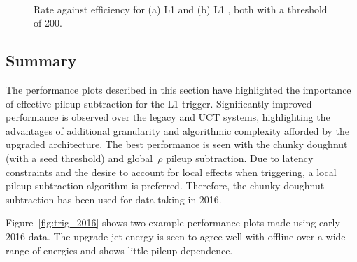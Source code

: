 \begin{figure}
\centering
	~
	\caption{Rate against efficiency for (a) L1 \scalht and (b) L1 \mht, both with a
	threshold of 200\GeV.}
	    \label{fig:rate_eff_sum}
\end{figure}

\subsection{Summary}

The performance plots described in this section have highlighted the importance of effective
pileup subtraction for the L1 trigger. Significantly improved performance is observed over 
the legacy and UCT systems, highlighting the advantages of additional granularity
and algorithmic complexity afforded by the upgraded architecture.
The best performance is seen with the chunky doughnut (with a seed threshold) 
and global~$\rho$ pileup subtraction. Due to latency constraints and the desire to account for 
local effects when triggering, a local pileup subtraction algorithm is preferred. 
Therefore, the chunky doughnut subtraction has been used for data taking in 2016.

Figure~\ref{fig:trig_2016} shows two example performance plots made using early 2016 data. 
The upgrade jet energy is seen to agree well with offline over a wide range of energies 
and shows little pileup dependence.


